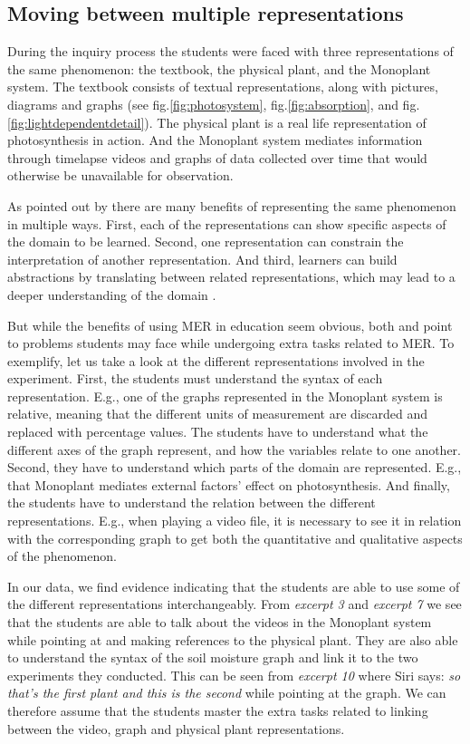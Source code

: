 \subsection{Moving between multiple representations}
During the inquiry process the students were faced with three representations of the same phenomenon: the textbook, the physical plant, and the Monoplant system. The textbook consists of textual representations, along with pictures, diagrams and graphs (see fig.\ref{fig:photosystem}, fig.\ref{fig:absorption}, and fig.\ref{fig:lightdependentdetail}). The physical plant is a real life representation of photosynthesis in action. And the Monoplant system mediates information through timelapse videos and graphs of data collected over time that would otherwise be unavailable for observation.  

As pointed out by \citet{van2006supporting} there are many benefits of representing the same phenomenon in multiple ways. First, each of the representations can show specific aspects of the domain to be learned. Second, one representation can constrain the interpretation of another representation. And third, learners can build abstractions by translating between related representations, which may lead to a deeper understanding of the domain \citep{ainsworth1999functions}. 

But while the benefits of using MER in education seem obvious, both \citet{ainsworth1999functions} and \citet{van2006supporting} point to problems students may face while undergoing extra tasks related to MER. To exemplify, let us take a look at the different representations involved in the experiment. First, the students must understand the syntax of each representation. E.g., one of the graphs represented in the Monoplant system is relative, meaning that the different units of measurement are discarded and replaced with percentage values. The students have to understand what the different axes of the graph represent, and how the variables relate to one another. Second, they have to understand which parts of the domain are represented. E.g., that Monoplant mediates external factors' effect on photosynthesis. And finally, the students have to understand the relation between the different representations. E.g., when playing a video file, it is necessary to see it in relation with the corresponding graph to get both the quantitative and qualitative aspects of the phenomenon.

In our data, we find evidence indicating that the students are able to use some of the different representations interchangeably. From \emph{excerpt 3} and \emph{excerpt 7} we see that the students are able to talk about the videos in the Monoplant system while pointing at and making references to the physical plant. They are also able to understand the syntax of the soil moisture graph and link it to the two experiments they conducted. This can be seen from \emph{excerpt 10} where Siri says: \emph{so that's the first plant and this is the second} while pointing at the graph. We can therefore assume that the students master the extra tasks related to linking between the video, graph and physical plant representations. 


